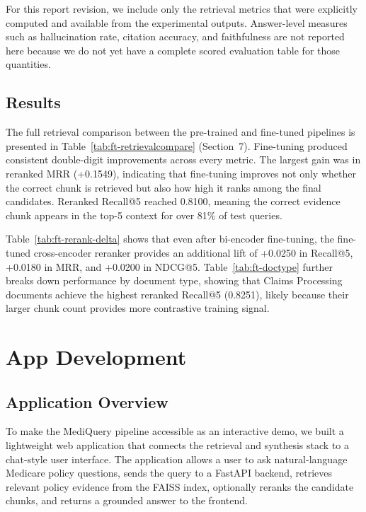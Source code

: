 \documentclass[10pt, letterpaper]{article}
\begin{document}
For this report revision, we include only the retrieval metrics that were explicitly
computed and available from the experimental outputs. Answer-level measures such as
hallucination rate, citation accuracy, and faithfulness are not reported here because
we do not yet have a complete scored evaluation table for those quantities.

\subsection{Results}

The full retrieval comparison between the pre-trained and fine-tuned pipelines is
presented in Table~\ref{tab:ft-retrievalcompare} (Section~7). Fine-tuning produced
consistent double-digit improvements across every metric. The largest gain was in
reranked MRR (+0.1549), indicating that fine-tuning improves not only whether the
correct chunk is retrieved but also how high it ranks among the final candidates.
Reranked Recall@5 reached 0.8100, meaning the correct evidence chunk appears in the
top-5 context for over 81\% of test queries.

Table~\ref{tab:ft-rerank-delta} shows that even after bi-encoder fine-tuning, the
fine-tuned cross-encoder reranker provides an additional lift of +0.0250 in Recall@5,
+0.0180 in MRR, and +0.0200 in NDCG@5. Table~\ref{tab:ft-doctype} further breaks
down performance by document type, showing that Claims Processing documents achieve
the highest reranked Recall@5 (0.8251), likely because their larger chunk count provides
more contrastive training signal.


\newpage
\section{App Development}

\subsection{Application Overview}

To make the MediQuery pipeline accessible as an interactive demo, we built a lightweight
web application that connects the retrieval and synthesis stack to a chat-style user
interface. The application allows a user to ask natural-language Medicare policy
questions, sends the query to a FastAPI backend, retrieves relevant policy evidence from
the FAISS index, optionally reranks the candidate chunks, and returns a grounded answer
to the frontend.
\end{document}
